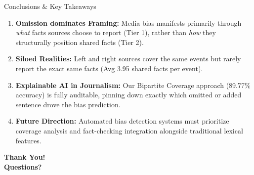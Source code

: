 \documentclass[aspectratio=169, 10pt]{beamer}
\begin{document}
\begin{frame}{Conclusions \& Key Takeaways}
    \begin{enumerate}
        \item \textbf{Omission dominates Framing:} Media bias manifests primarily through \textit{what} facts sources choose to report (Tier 1), rather than \textit{how} they structurally position shared facts (Tier 2).
        \item \textbf{Siloed Realities:} Left and right sources cover the same events but rarely report the exact same facts (Avg 3.95 shared facts per event).
        \item \textbf{Explainable AI in Journalism:} Our Bipartite Coverage approach (89.77\% accuracy) is fully auditable, pinning down exactly which omitted or added sentence drove the bias prediction.
        \item \textbf{Future Direction:} Automated bias detection systems must prioritize coverage analysis and fact-checking integration alongside traditional lexical features.
    \end{enumerate}
    
    \vspace{0.5cm}
    \centering
    \textbf{Thank You! \\ Questions?}
\end{frame}
\end{document}
